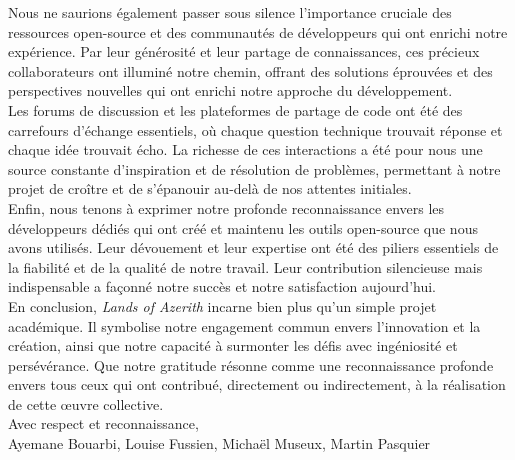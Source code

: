 Nous ne saurions également passer sous silence l'importance cruciale des ressources open-source et des communautés de développeurs qui ont enrichi notre expérience.
Par leur générosité et leur partage de connaissances, ces précieux collaborateurs ont illuminé notre chemin, offrant des solutions éprouvées et des perspectives
nouvelles qui ont enrichi notre approche du développement.
\\

Les forums de discussion et les plateformes de partage de code ont été des carrefours d'échange essentiels, où chaque question technique trouvait réponse et chaque
idée trouvait écho. La richesse de ces interactions a été pour nous une source constante d'inspiration et de résolution de problèmes, permettant à notre projet de
croître et de s'épanouir au-delà de nos attentes initiales.
\\

Enfin, nous tenons à exprimer notre profonde reconnaissance envers les développeurs dédiés qui ont créé et maintenu les outils open-source que nous avons utilisés.
Leur dévouement et leur expertise ont été des piliers essentiels de la fiabilité et de la qualité de notre travail. Leur contribution silencieuse mais indispensable
a façonné notre succès et notre satisfaction aujourd'hui.
\\

En conclusion, \textit{Lands of Azerith} incarne bien plus qu'un simple projet académique. Il symbolise notre engagement commun envers l'innovation et la création, ainsi
que notre capacité à surmonter les défis avec ingéniosité et persévérance. Que notre gratitude résonne comme une reconnaissance profonde envers tous ceux qui ont
contribué, directement ou indirectement, à la réalisation de cette œuvre collective.
\\

Avec respect et reconnaissance,
\\

Ayemane Bouarbi, Louise Fussien, Michaël Museux, Martin Pasquier